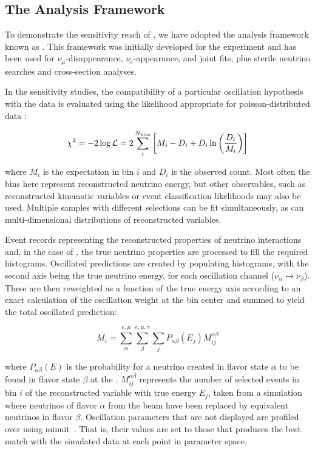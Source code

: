\subsection{The Analysis Framework}
\label{sect:methods-cafana}

To demonstrate the sensitivity reach of , we have adopted the analysis framework known as . This framework was initially developed for the  experiment and has been used for $\nu_\mu$-disappearance, $\nu_e$-appearance, and joint fits, plus sterile neutrino searches and cross-section analyses.

In the sensitivity studies, the compatibility of a particular oscillation hypothesis with the data is evaluated using the likelihood appropriate for poisson-distributed data \cite{Tanabashi:2018oca}:

\begin{equation}
    \chi^2 = -2\log\mathcal{L} = 2\sum_i^{N_{\rm bins}}\left[ M_i-D_i+D_i\ln\left({D_i\over M_i}\right) \right]
\end{equation}

where $M_i$ is the  %
expectation in bin $i$ and $D_i$ is the observed count. Most often the bins here represent reconstructed neutrino energy, but other observables, such as reconstructed kinematic variables or event classification likelihoods may also be used. Multiple samples with different selections can be fit simultaneously, as can multi-dimensional distributions of reconstructed variables.

Event records representing the reconstructed properties of neutrino interactions and, in the case of  , the true neutrino properties are processed to fill the required histograms. Oscillated  predictions are created by populating \twod histograms, with the second axis being the true neutrino energy, for each oscillation channel ($\nu_\alpha\to\nu_\beta$). These are then reweighted as a function of the true energy axis according to an exact calculation of the oscillation weight at the bin center %
and summed to yield the total oscillated prediction:

\begin{equation}
    M_i = \sum_\alpha^{e,\mu}\sum_\beta^{e,\mu,\tau}\sum_j P_{\alpha\beta}(E_j)M_{ij}^{\alpha\beta}
    \label{eqn:cafana_ll}
\end{equation}

where $P_{\alpha\beta}(E)$ is the probability for a neutrino created in flavor state $\alpha$ to be found in flavor state $\beta$ at the . $M_{ij}^{\alpha\beta}$ represents the number of selected events in bin $i$ of the reconstructed variable with true energy $E_j$, taken from a simulation where neutrinos of flavor $\alpha$ from the beam have been replaced by equivalent neutrinos in flavor $\beta$. Oscillation parameters that are not displayed are profiled over using {\sc minuit}~\cite{James:1994vla}. That is, their values are set to those that produces the best match with the simulated data at each point in parameter space.

